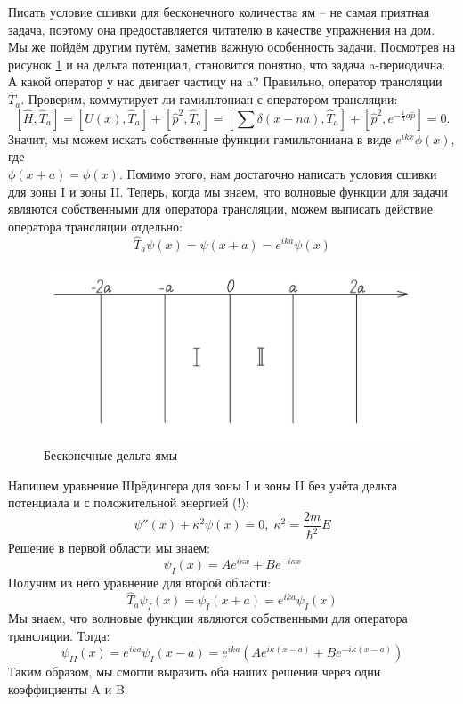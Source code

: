 Писать условие сшивки для бесконечного количества ям -- не самая приятная задача, поэтому она предоставляется читателю в качестве упражнения на дом. Мы же пойдём другим путём, заметив важную особенность задачи. Посмотрев на рисунок \ref{fig 4.5} и на дельта потенциал, становится понятно, что задача a-периодична. А какой оператор у нас двигает частицу на a? Правильно, оператор трансляции $\hat{T}_a$. Проверим, коммутирует ли гамильтониан с оператором трансляции:
\[
\left[\hat{H}, \hat{T}_a\right] = \left[U(x), \hat{T}_a\right] + \left[\hat{p}^2, \hat{T}_a\right] = \left[\sum\delta(x-na), \hat{T}_a\right] + \left[\hat{p}^2, e^{-\frac{i}{\hbar}a\hat{p}}\right] = 0.
\]
Значит, мы можем искать собственные функции гамильтониана в виде $e^{ikx}\phi(x)$, где \\ $\phi(x + a) = \phi(x)$. Помимо этого, нам достаточно написать условия сшивки для зоны I и зоны II. Теперь, когда мы знаем, что волновые функции для задачи являются собственными для оператора трансляции, можем выписать действие оператора трансляции отдельно:
\[
\hat{T}_a\psi(x) = \psi(x+a) = e^{i k a}\psi(x)
\]
\begin{figure}[!ht]
\centering
\includegraphics[scale=0.27]{class_4/images/inf delta hole.png}
\caption{Бесконечные дельта ямы}
\label{fig 4.5}
\end{figure}

Напишем уравнение Шрёдингера для зоны I и зоны II без учёта дельта потенциала и с положительной энергией (!):
\[
\psi''(x) + \kappa^2\psi(x) = 0, \; \kappa^2 = \frac{2m}{\hbar^2}E
\]
Решение в первой области мы знаем:
\[
\psi_I(x) = Ae^{i\kappa x} + Be^{-i\kappa x}
\]
Получим из него уравнение для второй области:
\[
\hat{T}_a\psi_I(x) = \psi_I(x+a) = e^{ika}\psi_I(x)
\]
Мы знаем, что волновые функции являются собственными для оператора трансляции. Тогда:
\[
\psi_{II}(x) = e^{ika}\psi_I(x-a) = e^{ika}\left(Ae^{i\kappa (x-a)} + Be^{-i\kappa (x - a)}\right)
\]
Таким образом, мы смогли выразить оба наших решения через одни коэффициенты A и B.

